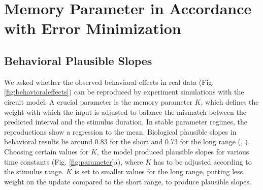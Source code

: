 \documentclass[10pt]{article}
\begin{document}
\section{Memory Parameter in Accordance with Error Minimization}
\subsection{Behavioral Plausible Slopes}
We asked whether the observed behavioral effects in real data (Fig. \ref{fig:behavioraleffects}) can be reproduced by experiment simulations with the circuit model. 
A crucial parameter is the memory parameter $K$, which defines the weight with which the input is adjusted to balance the mismatch between the predicted interval and the stimulus duration. 
In stable parameter regimes, the reproductions show a regression to the mean. 
Biological plausible slopes in behavioral results lie around 0.83 for the short and 0.73 for the long range (\cite{Thurley2018}, \cite{Jazayeri2010}). 
Choosing certain values for $K$, the model produced plausible slopes for various time constants (Fig. \ref{fig:parameter}a), where $K$ has to be adjusted according to the stimulus range. $K$ is set to smaller values for the long range, putting less weight on the update compared to the short range, to produce plausible slopes.
\end{document}
